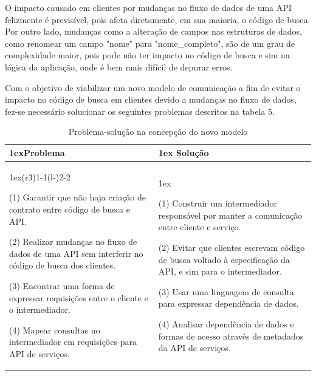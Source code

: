 O impacto causado em clientes por mudanças no fluxo de dados de uma API felizmente é previsível, pois afeta diretamente, em sua maioria, o código de busca. Por outro lado, mudanças como a alteração de campos nas estruturas de dados, como renomear um campo "nome" para "nome\_completo", são de um grau de complexidade maior, pois pode não ter impacto no código de busca e sim na lógica da aplicação, onde é bem mais difícil de depurar erros.

Com o objetivo de viabilizar um novo modelo de comunicação a fim de evitar o impacto no código de busca em clientes devido a mudanças no fluxo de dados, fez-se necessário solucionar os seguintes problemas descritos na tabela 5. \\

\begin{table}[H]
  \begin{tabularx}{\linewidth}{>{\parskip1ex}X@{\kern4\tabcolsep}>{\parskip1ex}X}
    \toprule
    \hfil\bfseries Problema
    &
    \hfil\bfseries Solução
    \\\cmidrule(r{3\tabcolsep}){1-1}\cmidrule(l{-\tabcolsep}){2-2}

    (1) Garantir que não haja criação de contrato entre código de busca e API.\par
    (2) Realizar mudanças no fluxo de dados de uma API sem interferir no código de busca dos clientes.\par
    (3) Encontrar uma forma de expressar requisições entre o cliente e o intermediador.\par
    (4) Mapear consultas no intermediador em requisições para API de serviços.\par

    &

    (1) Construir um intermediador responsável por manter a comunicação entre cliente e serviço.\par
	(2) Evitar que clientes escrevam código de busca voltado à especificação da API, e sim para o intermediador.\par
    (3) Usar uma linguagem de consulta para expressar dependência de dados.\par
    (4) Analisar dependência de dados e formas de acesso através de metadados da API de serviços.\par

\\\bottomrule
  \end{tabularx}
  \caption{Problema-solução na concepção do novo modelo}
\end{table}

